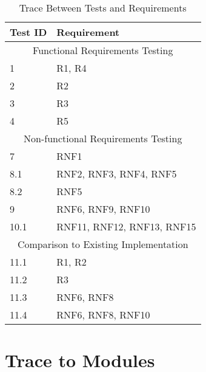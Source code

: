 \documentclass[12pt, titlepage]{article}
\begin{document}
\begin{table}[h!]
\centering
\begin{tabular}{p{} p{}}
\toprule
\textbf{Test ID} & \textbf{Requirement}\\
\midrule
\multicolumn{2}{c}{Functional Requirements Testing} \\
\midrule
1 & R1, R4 \\
2 & R2 \\
3 & R3 \\
4 & R5 \\

\midrule
\multicolumn{2}{c}{Non-functional Requirements Testing} \\
\midrule

7 & RNF1\\
8.1 & RNF2, RNF3, RNF4, RNF5\\
8.2 & RNF5\\
9 &  RNF6, RNF9, RNF10\\
10.1 & RNF11, RNF12, RNF13, RNF15\\
\midrule
\multicolumn{2}{c}{Comparison to Existing Implementation} \\
\midrule
11.1 & R1, R2\\
11.2 & R3\\
11.3 & RNF6, RNF8\\
11.4 & RNF6, RNF8, RNF10\\
\bottomrule
\end{tabular}
\caption{Trace Between Tests and Requirements}
\end{table}

\pagebreak
		
\section{Trace to Modules} %
\end{document}
